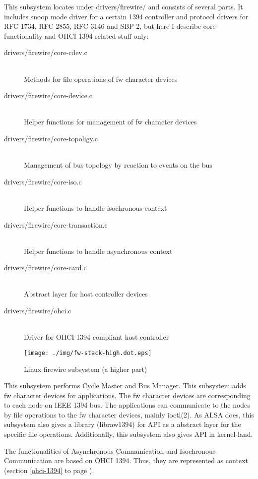 \documentclass[onecolumn]{article}
\begin{document}
This subsystem locates under drivers/firewire/ and consists of several parts. It includes snoop mode driver for a certain 1394 controller and protocol drivers for RFC 1734, RFC 2855, RFC 3146 and SBP-2, but here I describe core functionality and OHCI 1394 related stuff only:

\begin{description}
\item[drivers/firewire/core-cdev.c] \mbox{} \\
Methods for file operations of fw character devices
\item[drivers/firewire/core-device.c] \mbox{} \\
Helper functions for management of fw character devices
\item[drivers/firewire/core-topoligy.c] \mbox{} \\
Management of bus topology by reaction to events on the bus
\item[drivers/firewire/core-iso.c] \mbox{} \\
Helper functions to handle isochronous context
\item[drivers/firewire/core-transaction.c] \mbox{} \\
Helper functions to handle asynchronous context
\item[drivers/firewire/core-card.c] \mbox{} \\
Abstract layer for host controller devices
\item[drivers/firewire/ohci.c] \mbox{} \\
Driver for OHCI 1394 compliant host controller
\end{description}

\begin{figure}[htbp]
	\centering
	\texttt{[image: ./img/fw-stack-high.dot.eps]}
	\caption{{Linux firewire subsystem (a higher part)}}
	\label{fw-stack-high}
\end{figure}

This subsystem performs Cycle Master and Bus Manager. This subsystem adds fw character devices for applications. The fw character devices are corresponding to each node on IEEE 1394 bus. The applications can communicate to the nodes by file operations to the fw character devices, mainly ioctl(2). As ALSA does, this subsystem also gives a library (libraw1394) for API as a abstract layer for the specific file operations. Additionally, this subsystem also gives API in kernel-land. 

The functionalities of Asynchronous Communication and Isochronous Communication are based on OHCI 1394. Thus, they are represented as context (section \ref{ohci-1394} to page \pageref{ohci-1394}).
\end{document}
